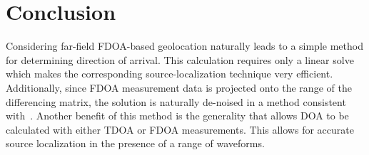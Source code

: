 \section{Conclusion}
\label{s:conclusion}
Considering far-field FDOA-based geolocation naturally leads to a simple method for determining direction of arrival. This calculation requires only a linear solve which makes the corresponding source-localization technique very efficient. Additionally, since FDOA measurement data is projected onto the range of the differencing matrix, the solution is naturally de-noised in a method consistent with~\cite{Schmidt1996,Compagnoni2017}. Another benefit of this method is the generality that allows DOA to be calculated with either TDOA or FDOA measurements. This allows for accurate source localization in the presence of a range of waveforms.
